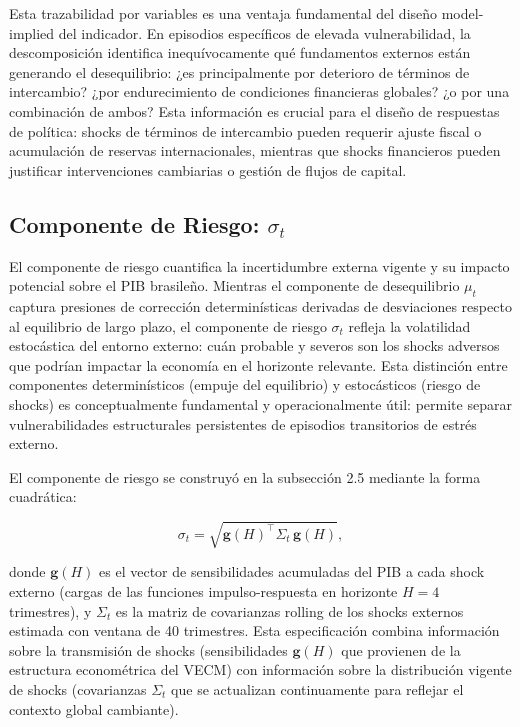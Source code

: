 \documentclass[3p,11pt,draft,natbib=false]{elsarticle}
\newcommand{\vect}[1]{\boldsymbol{#1}}
\begin{document}
Esta trazabilidad por variables es una ventaja fundamental del diseño model-implied del indicador. En episodios específicos de elevada vulnerabilidad, la descomposición identifica inequívocamente qué fundamentos externos están generando el desequilibrio: ¿es principalmente por deterioro de términos de intercambio? ¿por endurecimiento de condiciones financieras globales? ¿o por una combinación de ambos? Esta información es crucial para el diseño de respuestas de política: shocks de términos de intercambio pueden requerir ajuste fiscal o acumulación de reservas internacionales, mientras que shocks financieros pueden justificar intervenciones cambiarias o gestión de flujos de capital.

\subsection{Componente de Riesgo: \texorpdfstring{$\sigma_t$}{sigma\_t}}
\label{sec:sigma}

El componente de riesgo cuantifica la incertidumbre externa vigente y su impacto potencial sobre el PIB brasileño. Mientras el componente de desequilibrio $\mu_t$ captura presiones de corrección determinísticas derivadas de desviaciones respecto al equilibrio de largo plazo, el componente de riesgo $\sigma_t$ refleja la volatilidad estocástica del entorno externo: cuán probable y severos son los shocks adversos que podrían impactar la economía en el horizonte relevante. Esta distinción entre componentes determinísticos (empuje del equilibrio) y estocásticos (riesgo de shocks) es conceptualmente fundamental y operacionalmente útil: permite separar vulnerabilidades estructurales persistentes de episodios transitorios de estrés externo.

El componente de riesgo se construyó en la subsección 2.5 mediante la forma cuadrática:

\begin{equation}
\sigma_t = \sqrt{\vect{g}(H)^\top \Sigma_t\, \vect{g}(H)},
\label{eq:sigma_recall}
\end{equation}

donde $\vect{g}(H)$ es el vector de sensibilidades acumuladas del PIB a cada shock externo (cargas de las funciones impulso-respuesta en horizonte $H=4$ trimestres), y $\Sigma_t$ es la matriz de covarianzas rolling de los shocks externos estimada con ventana de 40 trimestres. Esta especificación combina información sobre la transmisión de shocks (sensibilidades $\vect{g}(H)$ que provienen de la estructura econométrica del VECM) con información sobre la distribución vigente de shocks (covarianzas $\Sigma_t$ que se actualizan continuamente para reflejar el contexto global cambiante).
\end{document}
